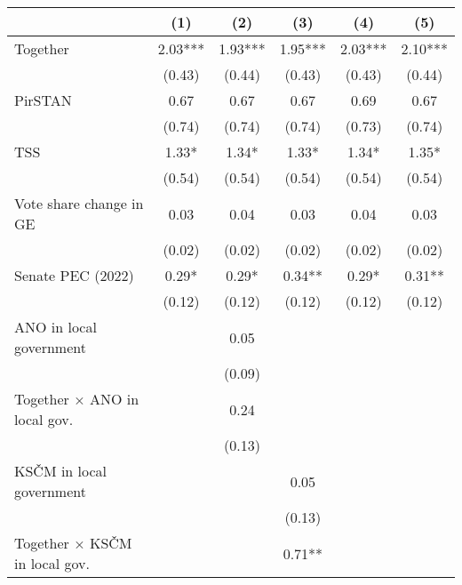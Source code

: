 \begin{tabular}[t]{lccccc}
\toprule
  & (1) & (2) & (3) & (4) & (5) \\
\midrule
Together                                & \num{2.03}***  & \num{1.93}***  & \num{1.95}***  & \num{2.03}***  & \num{2.10}***  \\
& (\num{0.43})   & (\num{0.44})   & (\num{0.43})   & (\num{0.43})   & (\num{0.44})   \\
PirSTAN                                 & \num{0.67}     & \num{0.67}     & \num{0.67}     & \num{0.69}     & \num{0.67}     \\
& (\num{0.74})   & (\num{0.74})   & (\num{0.74})   & (\num{0.73})   & (\num{0.74})   \\
TSS                                     & \num{1.33}*    & \num{1.34}*    & \num{1.33}*    & \num{1.34}*    & \num{1.35}*    \\
& (\num{0.54})   & (\num{0.54})   & (\num{0.54})   & (\num{0.54})   & (\num{0.54})   \\
Vote share change in GE                 & \num{0.03}    & \num{0.04}    & \num{0.03}    & \num{0.04}    & \num{0.03}     \\
& (\num{0.02})   & (\num{0.02})   & (\num{0.02})   & (\num{0.02})   & (\num{0.02})   \\
Senate PEC (2022)                       & \num{0.29}*    & \num{0.29}*    & \num{0.34}**   & \num{0.29}*    & \num{0.31}**   \\
& (\num{0.12})   & (\num{0.12})   & (\num{0.12})   & (\num{0.12})   & (\num{0.12})   \\
ANO in local government                 &                 & \num{0.05}     &                 &                 &                 \\
&                 & (\num{0.09})   &                 &                 &                 \\
Together × ANO in local gov.            &                 & \num{0.24}    &                 &                 &                 \\
&                 & (\num{0.13})   &                 &                 &                 \\
KSČM in local government                &                 &                 & \num{0.05}     &                 &                 \\
&                 &                 & (\num{0.13})   &                 &                 \\
Together × KSČM in local gov.           &                 &                 & \num{0.71}**   &                 &                 \\

\end{tabular}
